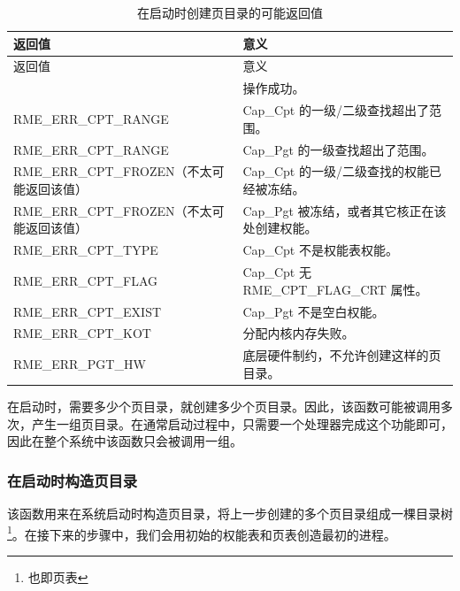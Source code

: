 \begin{xltabular}{\textwidth}{@{}>{\hsize\raggedright\arraybackslash}X>{\hsize\raggedright\arraybackslash}X@{}}
\caption{在启动时创建页目录的可能返回值}\label{tab:7-46-create-page-directory-at-boot-return-values}\\
\toprule
返回值 & 意义\tabularnewline
\endfirsthead
\toprule
返回值 & 意义\tabularnewline
\midrule
\endhead
\bottomrule
{} & 操作成功。\tabularnewline
    RME\_ERR\_CPT\_RANGE & Cap\_Cpt 的一级/二级查找超出了范围。\tabularnewline
    RME\_ERR\_CPT\_RANGE & Cap\_Pgt 的一级查找超出了范围。\tabularnewline
    RME\_ERR\_CPT\_FROZEN（不太可能返回该值） & Cap\_Cpt 的一级/二级查找的权能已经被冻结。\tabularnewline
    RME\_ERR\_CPT\_FROZEN（不太可能返回该值） & Cap\_Pgt 被冻结，或者其它核正在该处创建权能。\tabularnewline
    RME\_ERR\_CPT\_TYPE & Cap\_Cpt 不是权能表权能。\tabularnewline
    RME\_ERR\_CPT\_FLAG & Cap\_Cpt 无 RME\_CPT\_FLAG\_CRT 属性。\tabularnewline
    RME\_ERR\_CPT\_EXIST & Cap\_Pgt 不是空白权能。\tabularnewline
    RME\_ERR\_CPT\_KOT & 分配内核内存失败。\tabularnewline
    RME\_ERR\_PGT\_HW & 底层硬件制约，不允许创建这样的页目录。\tabularnewline
\end{xltabular}

在启动时，需要多少个页目录，就创建多少个页目录。因此，该函数可能被调用多次，产生一组页目录。在通常启动过程中，只需要一个处理器完成这个功能即可，因此在整个系统中该函数只会被调用一组。

\subsubsection{在启动时构造页目录}\label{subsubsec:7-construct-page-directory-at-boot}

该函数用来在系统启动时构造页目录，将上一步创建的多个页目录组成一棵目录树\footnote{也即页表}。在接下来的步骤中，我们会用初始的权能表和页表创造最初的进程。

